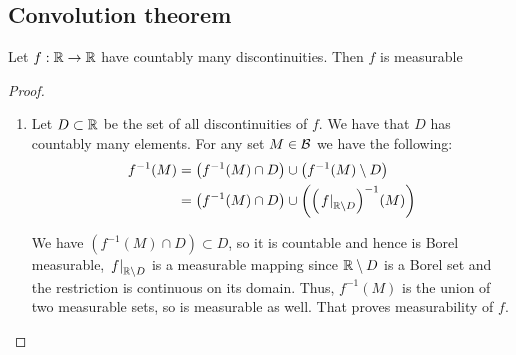 \subsection{Convolution theorem}
\begin{lemma} \label{lm:piecewise cts msb} Let $f:\mathbb{R}\to \mathbb{R}$ have countably many discontinuities. Then $f$ is measurable
\end{lemma}
\begin{proof}
	\begin{enumerate}
		\item Let $D \subset \mathbb{R}$ be the set of all discontinuities of $f$. We have that $D$ has countably many elements. For any set $M \in \mathcal{B}$ we have the following:
		      \begin{equation}
			      \begin{aligned}
				      f^{-1}(M)
				       & = \left(f^{-1}(M) \cap D\right) \cup \left(f^{-1}(M) \setminus D\right)                                 \\
				       & = \left(f^{-1}(M) \cap D\right) \cup \left({\left(\left.f\right|_{\mathbb{R}\setminus D}\right)}^{-1}(M)\right)
			      \end{aligned} \label{eq:null set preimage split}
		      \end{equation}

		      We have $\left(f^{-1}(M) \cap D\right) \subset D$, so it is countable and hence is Borel measurable, $\left.f\right|_{\mathbb{R}\setminus D}$ is a measurable mapping since $\mathbb{R}\setminus D$ is a Borel set and the restriction is continuous on its domain. Thus, $f^{-1}(M)$ is the union of two measurable sets, so is measurable as well. That proves measurability of $f$.
	\end{enumerate}
\end{proof}

